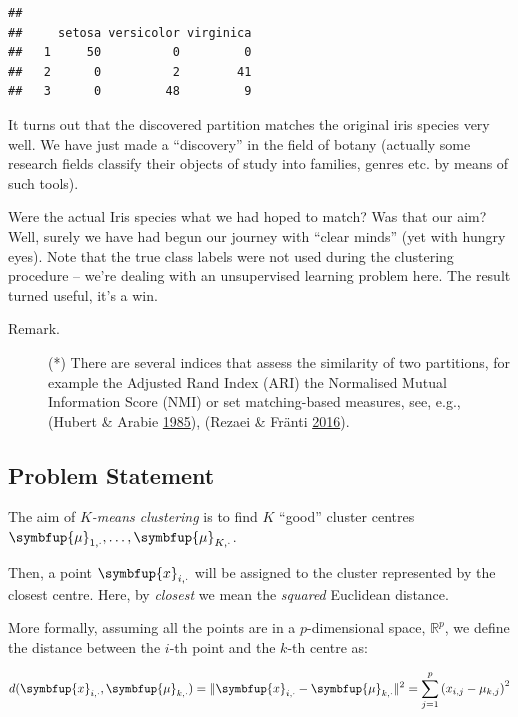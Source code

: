 \documentclass[10pt,b5paper,krantz1]{krantz}
\renewcommand{\mathbf}[1]{\symbfup{#1}}
\renewcommand{\boldsymbol}[1]{\symbfup{#1}}
\begin{document}
\begin{verbatim}
##    
##     setosa versicolor virginica
##   1     50          0         0
##   2      0          2        41
##   3      0         48         9
\end{verbatim}

It turns out that the discovered partition matches the original iris
species very well. We have just made a ``discovery'' in the field of
botany (actually some research fields classify their objects of study
into families, genres etc. by means of such tools).

Were the actual Iris species what we had hoped to match?
Was that our aim? Well, surely we have had begun our journey with
``clear minds'' (yet with hungry eyes). Note that the true class labels
were not used during the clustering procedure -- we're dealing with
an unsupervised learning problem here. The result turned useful,
it's a win.

\begin{description}
\item[Remark.]
(*) There are several indices that assess the
similarity of two partitions, for example the Adjusted Rand Index (ARI)
the Normalised Mutual Information Score (NMI)
or set matching-based measures,
see, e.g., (Hubert \& Arabie \protect\hyperlink{ref-comparing_paritions}{1985}), (Rezaei \& Fränti \protect\hyperlink{ref-external_cluster_validity}{2016}).
\end{description}

\hypertarget{problem-statement}{%
\subsection{Problem Statement}\label{problem-statement}}

The aim of \emph{\(K\)-means clustering} is to find \(K\) ``good'' cluster centres
\(\boldsymbol\mu_{1,\cdot}, \dots, \boldsymbol\mu_{K,\cdot}\).

Then, a point \(\mathbf{x}_{i,\cdot}\) will be assigned to the
cluster represented by the closest centre. Here, by \emph{closest}
we mean the \emph{squared} Euclidean distance.

More formally,
assuming all the points are in a \(p\)-dimensional space, \(\mathbb{R}^p\),
we define the distance between the \(i\)-th point and the \(k\)-th
centre as:

\[
d(\mathbf{x}_{i,\cdot}, \boldsymbol\mu_{k,\cdot}) = \| \mathbf{x}_{i,\cdot} - \boldsymbol\mu_{k,\cdot} \|^2 =  \sum_{j=1}^p \left(x_{i,j}-\mu_{k,j}\right)^2
\]
\end{document}

